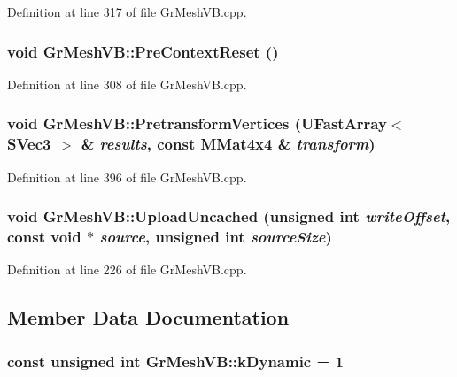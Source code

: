 Definition at line 317 of file GrMeshVB.cpp.\hypertarget{class_gr_mesh_v_b_ee2b47b8a2756a126ad6cb9dd42584fa}{
\subsubsection[{PreContextReset}]{\setlength{\rightskip}{0pt plus 5cm}void GrMeshVB::PreContextReset ()}}
\label{class_gr_mesh_v_b_ee2b47b8a2756a126ad6cb9dd42584fa}




Definition at line 308 of file GrMeshVB.cpp.\hypertarget{class_gr_mesh_v_b_00dead254e2ce78b7929a3daa3556a08}{
\subsubsection[{PretransformVertices}]{\setlength{\rightskip}{0pt plus 5cm}void GrMeshVB::PretransformVertices ({\bf UFastArray}$<$ {\bf SVec3} $>$ \& {\em results}, \/  const {\bf MMat4x4} \& {\em transform})}}
\label{class_gr_mesh_v_b_00dead254e2ce78b7929a3daa3556a08}




Definition at line 396 of file GrMeshVB.cpp.\hypertarget{class_gr_mesh_v_b_a9fc0e3fbcc1d0aeaba5b489ed72f8af}{
\subsubsection[{UploadUncached}]{\setlength{\rightskip}{0pt plus 5cm}void GrMeshVB::UploadUncached (unsigned int {\em writeOffset}, \/  const void $\ast$ {\em source}, \/  unsigned int {\em sourceSize})}}
\label{class_gr_mesh_v_b_a9fc0e3fbcc1d0aeaba5b489ed72f8af}




Definition at line 226 of file GrMeshVB.cpp.

\subsection{Member Data Documentation}
\hypertarget{class_gr_mesh_v_b_2af3fdf0087d2543d2861bd677139cdc}{
\subsubsection[{kDynamic}]{\setlength{\rightskip}{0pt plus 5cm}const unsigned int {\bf GrMeshVB::kDynamic} = 1}}
\label{class_gr_mesh_v_b_2af3fdf0087d2543d2861bd677139cdc}




